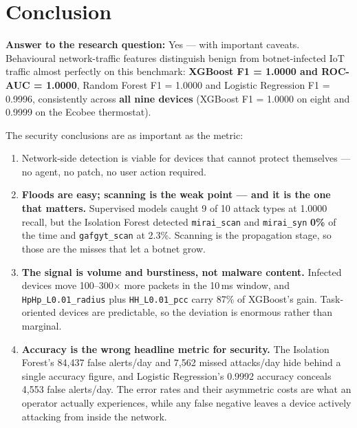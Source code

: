 \documentclass[11pt]{article}
\begin{document}
\section{Conclusion}
\textbf{Answer to the research question:}
Yes --- with important caveats. Behavioural network-traffic features distinguish
benign from botnet-infected IoT traffic almost perfectly on this benchmark:
\textbf{XGBoost F1 = 1.0000 and ROC-AUC = 1.0000}, Random Forest F1 = 1.0000
and Logistic Regression F1 = 0.9996, consistently across \textbf{all nine
devices} (XGBoost F1 = 1.0000 on eight and 0.9999 on the Ecobee thermostat).

The security conclusions are as important as the metric:

\begin{enumerate}[itemsep=3pt]
  \item Network-side detection is viable for devices that cannot protect
        themselves --- no agent, no patch, no user action required.
  \item \textbf{Floods are easy; scanning is the weak point --- and it is the
        one that matters.} Supervised models caught 9 of 10 attack types at
        1.0000 recall, but the Isolation Forest detected
        \texttt{mirai\_scan} and \texttt{mirai\_syn} \textbf{0\%} of the time
        and \texttt{gafgyt\_scan} at 2.3\%. Scanning is the propagation stage,
        so those are the misses that let a botnet grow.
  \item \textbf{The signal is volume and burstiness, not malware content.}
        Infected devices move 100--300$\times$ more packets in the 10\,ms
        window, and \texttt{HpHp\_L0.01\_radius} plus \texttt{HH\_L0.01\_pcc}
        carry 87\% of XGBoost's gain. Task-oriented devices are predictable, so
        the deviation is enormous rather than marginal.
  \item \textbf{Accuracy is the wrong headline metric for security.} The Isolation
        Forest's 84,437 false alerts/day and 7,562 missed attacks/day hide
        behind a single accuracy figure, and Logistic Regression's 0.9992
        accuracy conceals 4,553 false alerts/day. The error rates and their
        asymmetric costs are what an operator actually experiences, while any
        false negative leaves a device actively attacking from inside the
        network.
\end{enumerate}
\end{document}
